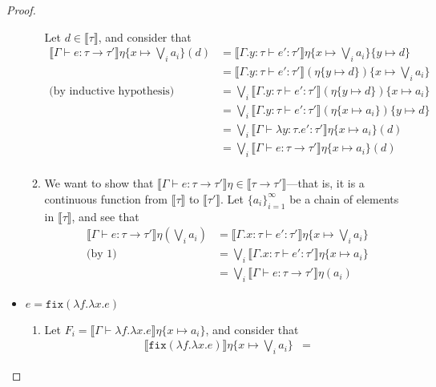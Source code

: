 \begin{proof}
\begin{itemize}
\begin{enumerate}
Let $d \in \llbracket \tau \rrbracket$, and consider that
\begin{align*}
\llbracket \Gamma \vdash e : \tau \rightarrow \tau' \rrbracket\eta\{x\mapsto  \bigvee_i a_i\}(d) 
&= \llbracket \Gamma.y : \tau \vdash e' : \tau'\rrbracket\eta\{x\mapsto  \bigvee_i a_i\}
\{y \mapsto d\} \\
&= \llbracket \Gamma.y : \tau \vdash e' : \tau'\rrbracket(\eta\{y \mapsto d\})\{x\mapsto  \bigvee_i a_i\} \\
\text{(by inductive hypothesis)}&=\bigvee_i\llbracket \Gamma.y:\tau\vdash e':\tau'\rrbracket(\eta\{y\mapsto d\})
\{x\mapsto a_i\} \\
&=\bigvee_i\llbracket \Gamma.y:\tau\vdash e':\tau'\rrbracket(\eta\{x\mapsto a_i\})\{y\mapsto d\} \\
&= \bigvee_i \llbracket \Gamma \vdash \lambda y : \tau.e' : \tau' \rrbracket \eta\{x\mapsto a_i\}(d) \\
&= \bigvee_i \llbracket \Gamma \vdash e : \tau \rightarrow \tau' \rrbracket \eta\{x\mapsto a_i\}(d) \\ 
\end{align*}
%
 \item We want to show that $\llbracket \Gamma \vdash e : \tau \rightarrow \tau' \rrbracket\eta \in \llbracket \tau \rightarrow 
 \tau'\rrbracket$---that is, it is a continuous function from $\llbracket \tau \rrbracket$ to $\llbracket \tau' \rrbracket$. Let 
 $\{a_i\}^{\infty}_{i=1}$ be a chain of elements in $\llbracket \tau \rrbracket$, and see that
 \begin{align*}
 \llbracket \Gamma \vdash e : \tau \rightarrow \tau' \rrbracket\eta(\bigvee_i a_i) &= \llbracket \Gamma.x : \tau 
 \vdash e' : \tau'\rrbracket\eta \{x \mapsto \bigvee_i a_i\} \\
 \text{(by 1)} &= \bigvee_i \llbracket \Gamma.x : \tau \vdash e' : \tau'\rrbracket\eta\{x\mapsto a_i\}\\
 &= \bigvee_i \llbracket \Gamma \vdash e : \tau \rightarrow \tau' \rrbracket\eta(a_i) 
 \end{align*}
 \end{enumerate} 
 \item $e = \texttt{fix} (\lambda f.\lambda x.e)$ \\
 \begin{enumerate}
\item Let $F_i = \llbracket \Gamma \vdash \lambda f. \lambda x.e\rrbracket\eta\{x\mapsto a_i\}$, and consider that 
 \begin{align*}
 \llbracket \texttt{fix} (\lambda f.\lambda x.e)\rrbracket\eta\{x\mapsto \bigvee_i a_i\} &= 

\end{align*}
\end{enumerate}
\end{itemize}
\end{proof}
